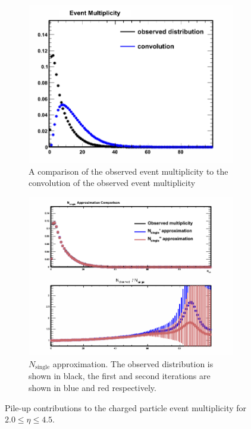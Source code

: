 \begin{figure}
	\centering
	\begin{subfigure}{0.49\textwidth}
		\includegraphics[width=\textwidth]{Chapters/multiplicity/charged_particle_event_multiplicity/images/comparison.png}
		\caption{A comparison of the observed event multiplicity to the convolution of the observed event multiplicity}
		\label{fig: convolution}
	\end{subfigure}
	\begin{subfigure}{0.49\textwidth}
		\includegraphics[width=\textwidth]{Chapters/multiplicity/charged_particle_event_multiplicity/images/n_single_approximation_comparison.png}
		\caption{$N_\mathrm{single}$ approximation. The observed distribution is shown in black, the first and second iterations are shown in blue and red respectively.}
		\label{fig: n single approximation}
	\end{subfigure}
	\caption{Pile-up contributions to the charged particle event multiplicity for $2.0 \le \eta \le 4.5$.}
\end{figure}

